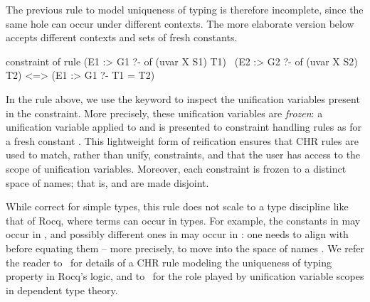 \documentclass[a4paper, 11pt]{book}
\begin{document}
The previous rule to model uniqueness of typing is therefore incomplete,
since the same hole can occur under different contexts. The more elaborate
version below accepts different contexts and sets of fresh constants.


\begin{elpicode}
constraint of {
  rule (E1 :> G1 ?- of (uvar X S1) T1)
     \ (E2 :> G2 ?- of (uvar X S2) T2)
   <=> (E1 :> G1 ?- T1 = T2)
}
\end{elpicode}

\noindent
In the rule above, we use the keyword  to inspect the unification
variables present in the constraint. More precisely, these unification
variables are \emph{frozen}: a unification variable  applied to
 and  is presented to constraint handling rules as
 for a fresh constant . This lightweight form of
reification ensures that CHR rules are used to match, rather than unify,
constraints, and that the user has access to the scope of unification
variables. Moreover, each constraint is frozen to a distinct space of names;
that is,  and  are made disjoint.


While correct for simple types, this rule does not scale to a type
discipline like that of Rocq, where terms can occur in types. For example,
the constants in  may occur in , and possibly different
ones in  may occur in : one needs to align 
with  before equating them -- more precisely, to move  into
the space of names .
We refer the reader to~\cite{TASSI_2019} for details of a CHR rule modeling
the uniqueness of typing property in Rocq's logic, and to~\cite{Jojgov} for
the role played by unification variable scopes in dependent type theory.





\end{document}
